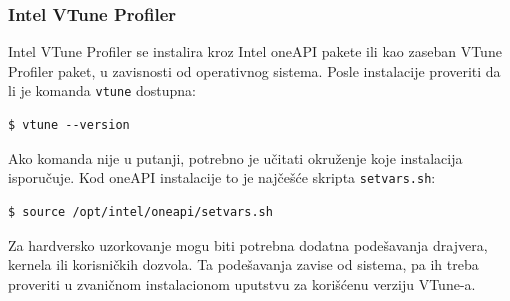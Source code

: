 \subsubsection{Intel VTune Profiler}\label{instalacija-intel-vtune-profiler}

Intel VTune Profiler se instalira kroz Intel oneAPI pakete ili kao zaseban VTune Profiler paket, u zavisnosti od operativnog sistema. Posle instalacije proveriti da li je komanda \texttt{vtune} dostupna:

\begin{verbatim}
$ vtune --version
\end{verbatim}

Ako komanda nije u putanji, potrebno je učitati okruženje koje instalacija isporučuje. Kod oneAPI instalacije to je najčešće skripta \texttt{setvars.sh}:

\begin{verbatim}
$ source /opt/intel/oneapi/setvars.sh
\end{verbatim}

Za hardversko uzorkovanje mogu biti potrebna dodatna podešavanja drajvera, kernela ili korisničkih dozvola. Ta podešavanja zavise od sistema, pa ih treba proveriti u zvaničnom instalacionom uputstvu za korišćenu verziju VTune-a.
